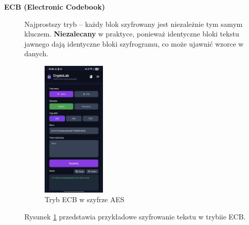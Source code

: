 \documentclass[12pt,a4paper]{article}
\begin{document}
\begin{description}
    \item[\textbf{ECB (Electronic Codebook)}] 
    Najprostszy tryb -- każdy blok szyfrowany jest niezależnie tym samym kluczem. 
    \textbf{Niezalecany} w praktyce, ponieważ identyczne bloki tekstu jawnego dają identyczne bloki szyfrogramu, 
    co może ujawnić wzorce w danych.
    \begin{figure}
        \centering
        \includegraphics[width=0.3\textwidth]{img/ECB.jpg}
        \caption{Tryb ECB w szyfrze AES}
        \label{fig:ecb}
    \end{figure}
    Rysunek \ref{fig:ecb} przedstawia przykładowe szyfrowanie tekstu w trybiie ECB.
    

\end{description}
\end{document}
